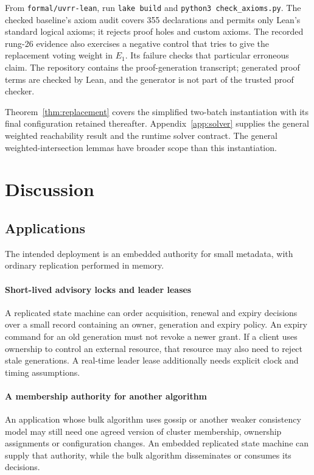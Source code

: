 \documentclass[10pt,journal,letterpaper]{IEEEtran}
\newcommand{\code}[1]{\texttt{#1}}
\begin{document}
From \code{formal/uvrr-lean}, run \code{lake build} and \code{python3 check\_axioms.py}. The checked baseline's axiom audit covers 355 declarations and permits only Lean's standard logical axioms; it rejects proof holes and custom axioms. The recorded rung-26 evidence also exercises a negative control that tries to give the replacement voting weight in $E_1$. Its failure checks that particular erroneous claim. The repository contains the proof-generation transcript; generated proof terms are checked by Lean, and the generator is not part of the trusted proof checker.

Theorem~\ref{thm:replacement} covers the simplified two-batch instantiation with its final configuration retained thereafter. Appendix~\ref{app:solver} supplies the general weighted reachability result and the runtime solver contract. The general weighted-intersection lemmas have broader scope than this instantiation.

\section{Discussion}\label{sec:discussion}
\subsection{Applications}
The intended deployment is an embedded authority for small metadata, with ordinary replication performed in memory.

\paragraph{Short-lived advisory locks and leader leases}
A replicated state machine can order acquisition, renewal and expiry decisions over a small record containing an owner, generation and expiry policy. An expiry command for an old generation must not revoke a newer grant. If a client uses ownership to control an external resource, that resource may also need to reject stale generations. A real-time leader lease additionally needs explicit clock and timing assumptions.

\paragraph{A membership authority for another algorithm}
An application whose bulk algorithm uses gossip or another weaker consistency model may still need one agreed version of cluster membership, ownership assignments or configuration changes. An embedded replicated state machine can supply that authority, while the bulk algorithm disseminates or consumes its decisions.
\end{document}
